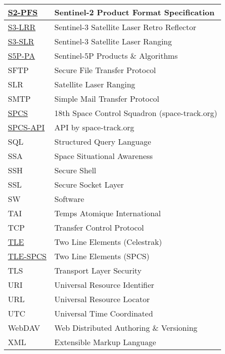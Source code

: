 \documentclass[dec_sum_main.tex]{subfiles}
\begin{document}
\begin{longtable}{|m{2.8cm}|m{10cm}|}
	\href{https://sentinels.copernicus.eu/documents/247904/685211/S2-PDGS-TAS-DI-PSD-V14.9.pdf/3d3b6c9c-4334-dcc4-3aa7-f7c0deffbaf7?t=1643013091529}{S2-PFS} & Sentinel-2 Product Format Specification\\ \hline
	\href{https://sentinels.copernicus.eu/web/sentinel/technical-guides/sentinel-3-altimetry/instrument/lrr}{S3-LRR} & Sentinel-3 Satellite Laser Retro Reflector\\ \hline	
	\href{https://sentinels.copernicus.eu/web/sentinel/technical-guides/sentinel-3-altimetry/pod/slr-tracking}{S3-SLR} & Sentinel-3 Satellite Laser Ranging\\ \hline
    \href{https://sentinels.copernicus.eu/web/sentinel/technical-guides/sentinel-5p/products-algorithms}{S5P-PA} & Sentinel-5P Products \& Algorithms\\ \hline
	SFTP & Secure File Transfer Protocol \\ \hline
	SLR & Satellite Laser Ranging \\ \hline
	SMTP & Simple Mail Transfer Protocol \\ \hline
	\href{https://www.space-track.org/}{SPCS} & 18th Space Control Squadron (space-track.org) \\ \hline
	\href{https://www.space-track.org/documentation#/api}{SPCS-API} & API by space-track.org \\ \hline
	SQL & Structured Query Language \\ \hline
	SSA & Space Situational Awareness \\ \hline
	SSH & Secure Shell \\ \hline
	SSL & Secure Socket Layer \\ \hline
	SW & Software \\ \hline
	TAI & Temps Atomique International \\ \hline
	TCP & Transfer Control Protocol \\ \hline
    \href{https://www.celestrak.com/NORAD/documentation/tle-fmt.php}{TLE} & Two Line Elements (Celestrak)\\ \hline    
	\href{https://www.space-track.org/documentation#tle}{TLE-SPCS} & Two Line Elements (SPCS)\\ \hline
	TLS & Transport Layer Security \\ \hline
	URI & Universal Resource Identifier \\ \hline
	URL & Universal Resource Locator \\ \hline
	UTC & Universal Time Coordinated \\ \hline
	WebDAV & Web Distributed Authoring \& Versioning \\ \hline
	XML & Extensible Markup Language \\ \hline						
\end{longtable}
\end{document}

